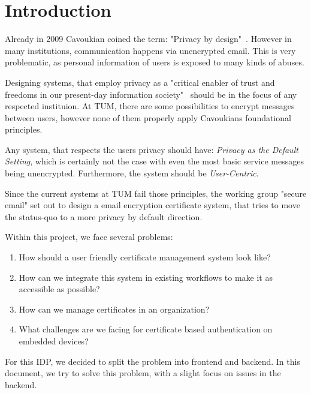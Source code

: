 \chapter{Introduction}\label{ch:introduction}
Already in 2009 Cavoukian coined the term: "Privacy by design"~\cite{cavoukian2009privacy}.
However in many institutions, communication happens via unencrypted email.
This is very problematic, as personal information of users is exposed to many kinds of abuses.

Designing systems, that employ privacy as a "critical enabler of trust and freedoms in our present-day information
society"~\cite{cavoukian2009privacy} should be in the focus of any respected instituion.
At TUM, there are some possibilities to encrypt messages between users, however none of them properly apply Cavoukians
foundational principles.

Any system, that respects the users privacy should have:
\emph{Privacy as the Default Setting}, which is certainly not the case with even the most basic service messages being
unencrypted.
Furthermore, the system should be \emph{User-Centric}.

Since the current systems at TUM fail those principles, the working group "secure email" set out to design a email
encryption certificate system, that tries to move the status-quo to a more privacy by default direction.

Within this project, we face several problems:
\begin{enumerate}
    \item How should a user friendly certificate management system look like?
    \item How can we integrate this system in existing workflows to make it as accessible as possible?
    \item How can we manage certificates in an organization?
    \item What challenges are we facing for certificate based authentication on embedded devices?
\end{enumerate}

For this IDP, we decided to split the problem into frontend and backend.
In this document, we try to solve this problem, with a slight focus on issues in the backend.
